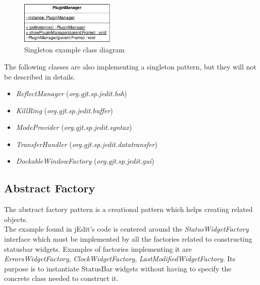 \begin{figure}[h!]
    \includegraphics[width=0.4\textwidth]{images/singleton.png}
    \centering
    \caption{Singleton example class diagram}
\end{figure}

\begin{framehint}
    The following classes are also implementing a singleton pattern, but they
    will not be described in details.

    \begin{itemize}\itemsep1pt
        \item \emph{ReflectManager} (\emph{org.gjt.sp.jedit.bsh})
        \item \emph{KillRing} (\emph{org.gjt.sp.jedit.buffer})
        \item \emph{ModeProvider} (\emph{org.gjt.sp.jedit.syntax})
        \item \emph{TransferHandler} (\emph{org.gjt.sp.jedit.datatransfer})
        \item \emph{DockableWindowFactory} (\emph{org.gjt.sp.jedit.gui})
    \end{itemize}
\end{framehint}
\newpage

\subsection{Abstract Factory}

\noindent The abstract factory pattern is a creational pattern which helps creating
related objects.\\

The example found in jEdit's code is centered around the
\emph{StatusWidgetFactory} interface which must be implemented by all the
factories related to constructing statusbar widgets. Examples of factories
implementing it are \emph{ErrorsWidgetFactory}, \emph{ClockWidgetFactory},
\emph{LastModifiedWidgetFactory}. Its purpose is to instantiate StatusBar
widgets without having to specify the concrete class needed to construct it.

